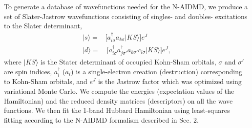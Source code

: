 To generate a database of wavefunctions needed for the N-AIDMD, 
we produce a set of Slater-Jastrow wavefunctions consisting of singles- and doubles- excitations 
to the Slater determinant, 
\begin{subequations}
\begin{eqnarray}
| s \rangle = & \Big[a^\dagger_{i \sigma} a_{k \sigma}   | KS \rangle \Big]e^J \\
| d \rangle = & \: \Big[a^\dagger_{i \sigma} a^\dagger_{j \sigma'} a_{k \sigma'} c_{l \sigma}   | KS \rangle\Big]e^J ,
\end{eqnarray}
\end{subequations}
where $|KS\rangle$ is the Stater determinant of occupied Kohn-Sham orbitals, $\sigma$ and $\sigma'$ are spin indices, 
$a_{i}^\dagger$ ($a_{i}$) is a single-electron creation (destruction) corresponding to Kohn-Sham orbitals, 
and $e^J$ is the Jastrow factor which was optimized using variational Monte Carlo. 
We compute the energies (expectation values of the Hamiltonian) and the reduced density matrices (descriptors) on all the wave functions. 
We then fit the 1-band Hubbard Hamiltonian using least-squares fitting according to the N-AIDMD formalism described in Sec. 2. %

